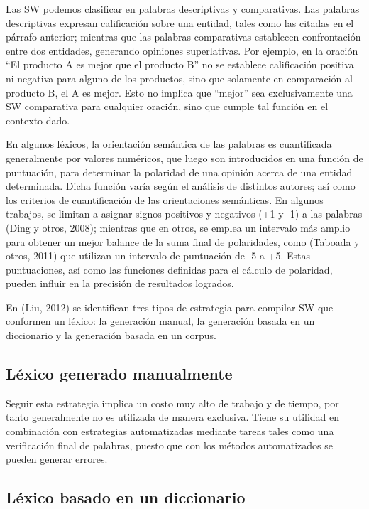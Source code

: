 {Las SW podemos clasificar en palabras descriptivas y comparativas. Las palabras descriptivas expresan calificaci\'on sobre una entidad, tales como las citadas en el p\'arrafo anterior; mientras que las palabras comparativas establecen confrontaci\'on entre dos entidades, generando opiniones superlativas. Por ejemplo, en la oraci\'on ``El producto A es mejor que el producto B'' no se establece calificaci\'on positiva ni negativa para alguno de los productos, sino que solamente en comparaci\'on al producto B, el A es mejor. Esto no implica que ``mejor'' sea exclusivamente una SW comparativa para cualquier oraci\'on, sino que cumple tal funci\'on en el contexto dado.
\newline

En algunos l\'exicos, la orientaci\'on sem\'antica de las palabras es cuantificada generalmente por valores num\'ericos, que luego son introducidos en una funci\'on de puntuaci\'on, para determinar la polaridad de una opini\'on acerca de una entidad determinada. Dicha funci\'on var\'ia seg\'un el an\'alisis de distintos autores; as\'i como los criterios de cuantificaci\'on de las orientaciones sem\'anticas. En algunos trabajos, se limitan a asignar signos positivos y negativos (+1 y -1) a las palabras (Ding y otros, 2008); mientras que en otros, se emplea un intervalo m\'as amplio para obtener un mejor balance de la suma final de polaridades, como (Taboada y otros, 2011) que utilizan un intervalo de puntuaci\'on de -5 a +5. Estas puntuaciones, as\'i como las funciones definidas para el c\'alculo de polaridad, pueden influir en la precisi\'on de resultados logrados.
\newline

En (Liu, 2012) se identifican tres tipos de estrategia para compilar SW que conformen un l\'exico: la generaci\'on manual, la generaci\'on basada en un diccionario y la generaci\'on basada en un corpus.

\subsection{L\'exico generado manualmente}

Seguir esta estrategia implica un costo muy alto de trabajo y de tiempo, por tanto generalmente no es utilizada de manera exclusiva. Tiene su utilidad en combinaci\'on con estrategias automatizadas mediante tareas tales como una verificaci\'on final de palabras, puesto que con los m\'etodos automatizados se pueden generar errores.

\subsection{L\'exico basado en un diccionario}

}
